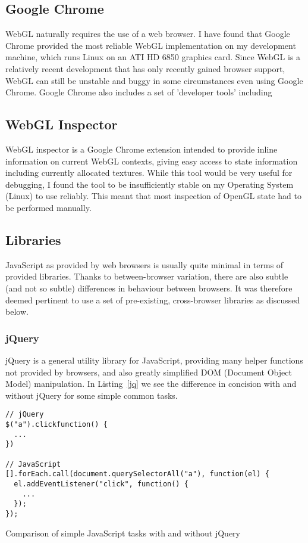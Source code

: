 \documentclass[12pt,twoside,notitlepage]{report}
\begin{document}
\subsection*{Google Chrome}
WebGL naturally requires the use of a web browser. I have found that Google Chrome provided the most reliable WebGL implementation on my development machine, which runs Linux on an ATI HD 6850 graphics card. Since WebGL is a relatively recent development that has only recently gained browser support, WebGL can still be unstable and buggy in some circumstances even using Google Chrome. Google Chrome also includes a set of 'developer tools' including 

\subsection*{WebGL Inspector}
WebGL inspector is a Google Chrome extension intended to provide inline information on current WebGL contexts, giving easy access to state information including currently allocated textures. While this tool would be very useful for debugging, I found the tool to be insufficiently stable on my Operating System (Linux) to use reliably. This meant that most inspection of OpenGL state had to be performed manually.

\subsection{Libraries}
JavaScript as provided by web browsers is usually quite minimal in terms of provided libraries. Thanks to between-browser variation, there are also subtle (and not so subtle) differences in behaviour between browsers. It was therefore deemed pertinent to use a set of pre-existing, cross-browser libraries as discussed below. 

\subsubsection{jQuery}
jQuery is a general utility library for JavaScript, providing many helper functions not provided by browsers, and also greatly simplified DOM (Document Object Model) manipulation. In Listing~\ref{jq} we see the difference in concision with and without jQuery for some simple common tasks.

\begin{listing}[H]
\label{jq}
\begin{verbatim}
// jQuery
$("a").clickfunction() {
  ...
})

// JavaScript
[].forEach.call(document.querySelectorAll("a"), function(el) {
  el.addEventListener("click", function() {
    ...
  });
});
\end{verbatim}
\caption{Comparison of simple JavaScript tasks with and without jQuery}
\end{listing}
\end{document}
